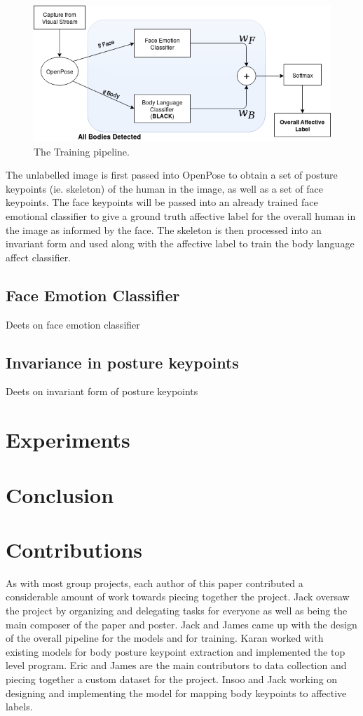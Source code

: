 \documentclass{article}
\begin{document}
\begin{figure}[h]
	\centering
	\includegraphics[scale=1]{Pipeline}
	\caption{The Training pipeline.}
\end{figure}
The unlabelled image is first passed into OpenPose to obtain a set of posture keypoints (ie. skeleton) of the human in the image, as well as a set of face keypoints. The face keypoints will be passed into an already trained face emotional classifier to give a ground truth affective label for the overall human in the image as informed by the face. The skeleton is then processed into an invariant form and used along with the affective label to train the body language affect classifier.

\subsection{Face Emotion Classifier}
Deets on face emotion classifier

\subsection{Invariance in posture keypoints}
Deets on invariant form of posture keypoints

\section{Experiments}
\section{Conclusion}
\section{Contributions}

As with most group projects, each author of this paper contributed a considerable amount of work towards piecing together the project. Jack oversaw the project by organizing and delegating tasks for everyone as well as being the main composer of the paper and poster. Jack and James came up with the design of the overall pipeline for the models and for training. Karan worked with existing models for body posture keypoint extraction and implemented the top level program. Eric and James are the main contributors to data collection and piecing together a custom dataset for the project. Insoo and Jack working on designing and implementing the model for mapping body keypoints to affective labels.
\end{document}
